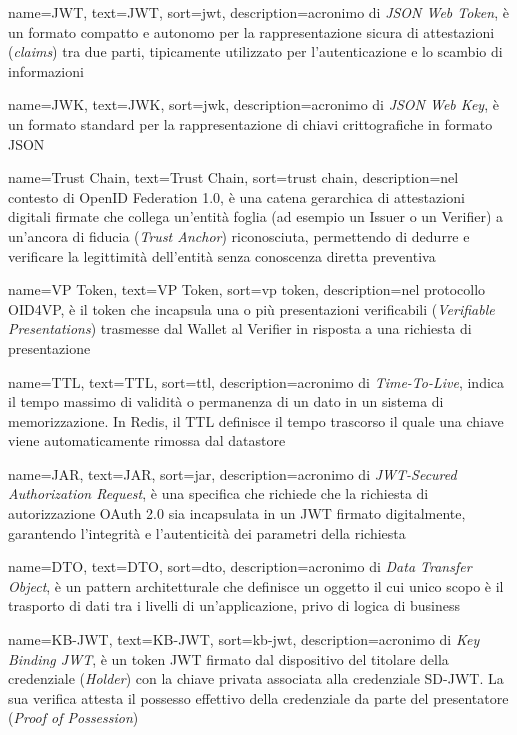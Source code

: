 {
    name=JWT,
    text=JWT,
    sort=jwt,
    description={acronimo di \emph{JSON Web Token}, è un formato compatto e autonomo per la rappresentazione sicura di attestazioni (\emph{claims}) tra due parti, tipicamente utilizzato per l'autenticazione e lo scambio di informazioni}
}

{
    name=JWK,
    text=JWK,
    sort=jwk,
    description={acronimo di \emph{JSON Web Key}, è un formato standard per la rappresentazione di chiavi crittografiche in formato JSON}
}

{
    name=Trust Chain,
    text=Trust Chain,
    sort=trust chain,
    description={nel contesto di OpenID Federation 1.0, è una catena gerarchica di attestazioni digitali firmate che collega un'entità foglia (ad esempio un Issuer o un Verifier) a un'ancora di fiducia (\emph{Trust Anchor}) riconosciuta, permettendo di dedurre e verificare la legittimità dell'entità senza conoscenza diretta preventiva}
}

{
    name=VP Token,
    text=VP Token,
    sort=vp token,
    description={nel protocollo OID4VP, è il token che incapsula una o più presentazioni verificabili (\emph{Verifiable Presentations}) trasmesse dal Wallet al Verifier in risposta a una richiesta di presentazione}
}

{
    name=TTL,
    text=TTL,
    sort=ttl,
    description={acronimo di \emph{Time-To-Live}, indica il tempo massimo di validità o permanenza di un dato in un sistema di memorizzazione. In Redis, il TTL definisce il tempo trascorso il quale una chiave viene automaticamente rimossa dal datastore}
}

{
    name=JAR,
    text=JAR,
    sort=jar,
    description={acronimo di \emph{JWT-Secured Authorization Request}, è una specifica che richiede che la richiesta di autorizzazione OAuth 2.0 sia incapsulata in un JWT firmato digitalmente, garantendo l'integrità e l'autenticità dei parametri della richiesta}
}

{
    name=DTO,
    text=DTO,
    sort=dto,
    description={acronimo di \emph{Data Transfer Object}, è un pattern architetturale che definisce un oggetto il cui unico scopo è il trasporto di dati tra i livelli di un'applicazione, privo di logica di business}
}

{
    name=KB-JWT,
    text=KB-JWT,
    sort=kb-jwt,
    description={acronimo di \emph{Key Binding JWT}, è un token JWT firmato dal dispositivo del titolare della credenziale (\emph{Holder}) con la chiave privata associata alla credenziale SD-JWT. La sua verifica attesta il possesso effettivo della credenziale da parte del presentatore (\emph{Proof of Possession})}
}

